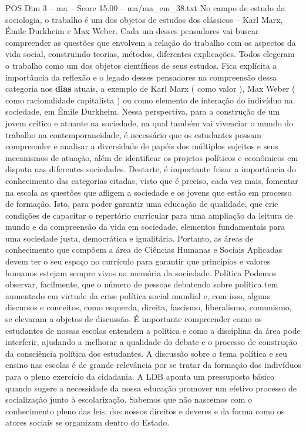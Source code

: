 \begin{textsample}{POS Dim 3 – ma – Score 15.00 – ma/ma\_em\_38.txt}
No campo de estudo da sociologia, o trabalho é um dos objetos de estudos dos clássicos – Karl Marx, Émile Durkheim e Max Weber.
Cada um desses pensadores vai buscar compreender as questões que envolvem a relação do trabalho com os aspectos da vida social, construindo teorias, métodos, diferentes explicações.
Todos elegeram o trabalho como um dos objetos científicos de seus estudos.
Fica explícita a importância da reflexão e o legado desses pensadores na compreensão dessa categoria nos \textbf{dias} atuais, a exemplo de Karl Marx ( como valor ), Max Weber ( como racionalidade capitalista ) ou como elemento de interação do indivíduo na sociedade, em Émile Durkheim.
Nessa perspectiva, para a construção de um jovem crítico e atuante na sociedade, na qual também vai vivenciar o mundo do trabalho na contemporaneidade, é necessário que os estudantes possam compreender e analisar a diversidade de papéis dos múltiplos sujeitos e seus mecanismos de atuação, além de identificar os projetos políticos e econômicos em disputa nas diferentes sociedades.
Destarte, é importante frisar a importância do conhecimento das categorias citadas, visto que é preciso, cada vez mais, fomentar na escola as questões que afligem a sociedade e os jovens que estão em processo de formação.
Isto, para poder garantir uma educação de qualidade, que crie condições de capacitar o repertório curricular para uma ampliação da leitura de mundo e da compreensão da vida em sociedade, elementos fundamentais para uma sociedade justa, democrática e igualitária.
Portanto, as áreas de conhecimento que compõem a área de Ciências Humanas e Sociais Aplicadas devem ter o seu espaço no currículo para garantir que princípios e valores humanos estejam sempre vivos na memória da sociedade.
Política Podemos observar, facilmente, que o número de pessoas debatendo sobre política tem aumentado em virtude da crise política social mundial e, com isso, alguns discursos e conceitos, como esquerda, direita, fascismo, liberalismo, comunismo, se elevaram a objetos de discussão.
É importante compreender como os estudantes de nossas escolas entendem a política e como a disciplina da área pode interferir, ajudando a melhorar a qualidade do debate e o processo de construção da consciência política dos estudantes.
A discussão sobre o tema política e seu ensino nas escolas é de grande relevância por se tratar da formação dos indivíduos para o pleno exercício da cidadania.
A LDB aponta um pressuposto básico quando sugere a necessidade da nossa educação promover um efetivo processo de socialização junto à escolarização.
Sabemos que não nascemos com o conhecimento pleno das leis, dos nossos direitos e deveres e da forma como os atores sociais se organizam dentro do Estado.

\end{textsample}
